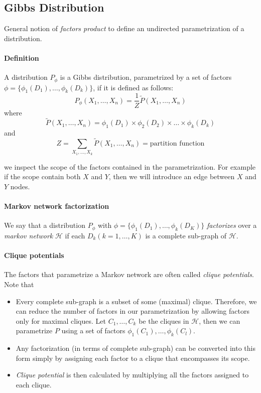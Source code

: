 \subsection{Gibbs Distribution}
General notion of \emph{factors product} to define an undirected parametrization of a distribution.

\paragraph{Definition} A distribution $P_\phi$ is a Gibbs distribution, parametrized by a set of factors $\phi = \{ \phi_1(D_1),\ldots,\phi_k(D_k)\}$, if it is defined as follows:
\[P_\phi(X_1,\ldots,X_n) = \frac{1}{Z} \tilde{P}(X_1,\ldots,X_n)\] where
\[\tilde{P}(X_1,\ldots,X_n) = \phi_1(D_1) \times \phi_2(D_2) \times \ldots \times \phi_k(D_k)  \] and
\[ Z = \sum_{X_1,\ldots, X_k} \tilde{P}(X_1,\ldots,X_n) = \text{partition function}\]

 we inspect the scope of the factors contained in the parametrization.  For example if the scope contain both $X$ and $Y$, then we will introduce an edge between $X$ and $Y$ nodes.

\paragraph {Markov network factorization} We say that a distribution $P_\phi$ with $\phi = \{\phi_1(D_1),\ldots,\phi_k(D_K)\}$ \emph{factorizes} over a \emph{markov network} $\mathcal{H}$ if each $D_k (k=1,\ldots, K)$ is a complete sub-graph of $\mathcal{H}$.

\paragraph {Clique potentials} The factors that parametrize a Markov network are often called \emph{clique potentials}.  Note that
\begin{itemize}
\item Every complete sub-graph is a subset of some (maximal) clique.  Therefore, we can reduce the number of factors in our parametrization by allowing factors only for maximal cliques. Let $C_1,\ldots,C_k$ be the cliques in $\mathcal{H}$, then we can parametrize $P$ using a set of factors $\phi_1(C_1),\ldots,\phi_k(C_l)$.
\item Any factorization (in terms of complete sub-graph) can be converted into this form simply by assigning each factor to a clique that encompasses its scope. 
\item \emph{Clique potential} is then calculated by multiplying all the factors assigned to each clique.
\end{itemize}


